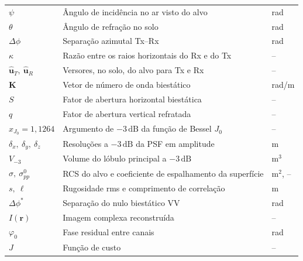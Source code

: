 \documentclass[12pt,a4paper,oneside]{book}
\theoremstyle{remark}
\newcommand{\vect}[1]{\boldsymbol{#1}}
\newcommand{\dB}{\,\mathrm{dB}}
\theoremstyle{plain}
\theoremstyle{definition}
\begin{document}
{\begin{longtable}{lll}
$\psi$                                    & Ângulo de incidência no ar visto do alvo            & rad       \\
$\theta$                                  & Ângulo de refração no solo                          & rad       \\
$\Delta\phi$                              & Separação azimutal Tx--Rx                           & rad       \\
$\kappa$                                  & Razão entre os raios horizontais do Rx e do Tx      & --        \\
$\hat{\vect u}_T,\ \hat{\vect u}_R$       & Versores, no solo, do alvo para Tx e Rx             & --        \\
$\vect K$                                 & Vetor de número de onda biestático                  & rad/m     \\
$S$                                       & Fator de abertura horizontal biestática             & --        \\
$q$                                       & Fator de abertura vertical refratada                & --        \\
$x_{J_0} = 1,1264$                        & Argumento de $-3\dB$ da função de Bessel $J_0$      & --        \\
$\delta_x,\ \delta_y,\ \delta_z$          & Resoluções a $-3\dB$ da PSF em amplitude            & m         \\
$V_{-3}$                                  & Volume do lóbulo principal a $-3\dB$                & m$^3$     \\
$\sigma,\ \sigma^0_{pp}$                  & RCS do alvo e coeficiente de espalhamento da superfície & m$^2$, -- \\
$s,\ \ell$                                & Rugosidade rms e comprimento de correlação          & m         \\
$\Delta\phi^\ast$                         & Separação do nulo biestático VV                     & rad       \\
$I(\vect r)$                              & Imagem complexa reconstruída                        & --        \\
$\varphi_0$                               & Fase residual entre canais                          & rad       \\
$J$                                       & Função de custo                                     & --        \\
\bottomrule
\end{longtable}}
\end{document}
